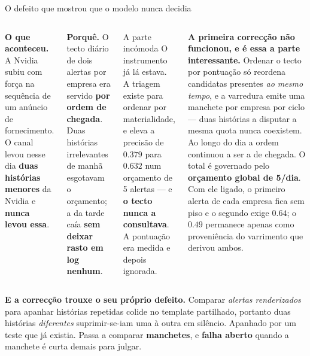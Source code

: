 \documentclass[aspectratio=169]{beamer}
\begin{document}
\begin{frame}{O defeito que mostrou que o modelo nunca decidia}
\small
\begin{columns}[T]
\textbf{O que aconteceu.} A Nvidia subiu com força na sequência de um anúncio de fornecimento. O
canal levou nesse dia \textbf{duas histórias menores} da Nvidia e \textbf{nunca levou essa}.
\medskip

\textbf{Porquê.} O tecto diário de dois alertas por empresa era servido \textbf{por ordem de
chegada}. Duas histórias irrelevantes de manhã esgotavam o orçamento; a da tarde caía \textbf{sem
deixar rasto em log nenhum}.
\begin{block}{\small A parte incómoda}
\small O instrumento já lá estava. A triagem existe para ordenar por materialidade, e eleva a
precisão de $0.379$ para $\mathbf{0.632}$ num orçamento de 5 alertas --- e \textbf{o tecto nunca a
consultava}. A pontuação era medida e depois ignorada.
\end{block}
\smallskip
{\footnotesize \textbf{A primeira correcção não funcionou, e é essa a parte interessante.} Ordenar
o tecto por pontuação só reordena candidatas presentes \emph{ao mesmo tempo}, e a varredura emite
uma manchete por empresa por ciclo --- duas histórias a disputar a mesma quota nunca coexistem. Ao
longo do dia a ordem continuou a ser a de chegada. O total é governado pelo \textbf{orçamento
global de 5/dia}. Com ele ligado, o primeiro alerta de cada empresa fica sem piso e o segundo
exige $0.64$; o $0.49$ permanece apenas como proveniência do varrimento que derivou ambos.}
\end{columns}
\vfill
{\footnotesize\textbf{E a correcção trouxe o seu próprio defeito.} Comparar \emph{alertas
renderizados} para apanhar histórias repetidas colide no template partilhado, portanto duas
histórias \emph{diferentes} suprimir-se-iam uma à outra em silêncio. Apanhado por um teste que já
existia. Passa a comparar \textbf{manchetes}, e \textbf{falha aberto} quando a manchete é curta
demais para julgar.}
\end{frame}
\end{document}
